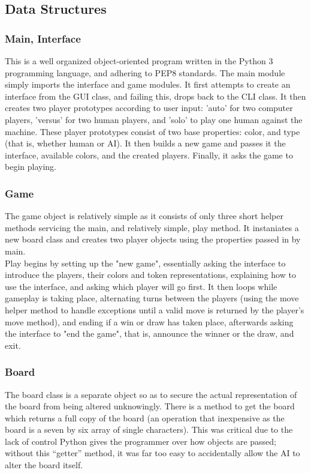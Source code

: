 \documentclass[12pt, article]{scrartcl}
\begin{document}
\subsection{Data Structures}
\subsubsection{Main, Interface}
This is a well organized object-oriented program written in the Python 3 programming language, and adhering to PEP8 standards. The main module simply imports the interface and game modules. It first attempts to create an interface from the GUI class, and failing this, drops back to the CLI class. It then creates two player prototypes according to user input: 'auto' for two computer players, 'versus' for two human players, and 'solo' to play one human against the machine. These player prototypes consist of two base properties: color, and type (that is, whether human or AI). It then builds a new game and passes it the interface, available colors, and the created players. Finally, it asks the game to begin playing.

\subsubsection{Game}
The game object is relatively simple as it consists of only three short helper methods servicing the main, and relatively simple, play method. It instaniates a new board class and creates two player objects using the properties passed in by main.
\\

Play begins by setting up the "new game", essentially asking the interface to introduce the players, their colors and token representations, explaining how to use the interface, and asking which player will go first. It then loops while gameplay is taking place, alternating turns between the players (using the move helper method to handle exceptions until a valid move is returned by the player's move method), and ending if a win or draw has taken place, afterwards asking the interface to "end the game", that is, announce the winner or the draw, and exit.

\subsubsection{Board}
The board class is a separate object so as to secure the actual representation of the board from being altered unknowingly. There is a method to get the board which returns a full copy of the board (an operation that inexpensive as the board is a seven by six array of single characters). This was critical due to the lack of control Python gives the programmer over how objects are passed; without this ``getter'' method, it was far too easy to accidentally allow the AI to alter the board itself.
\\
\end{document}
